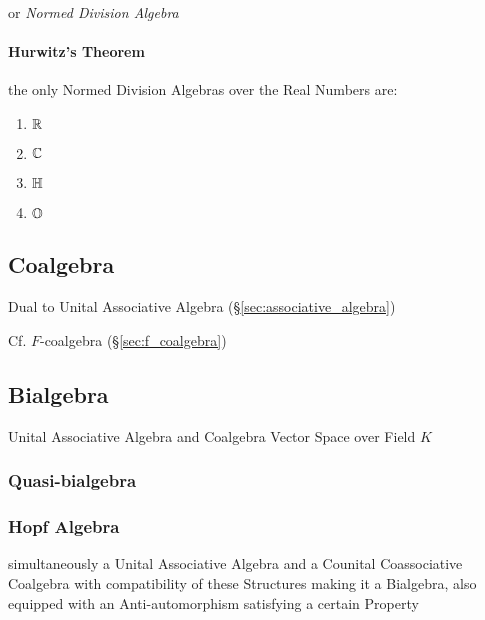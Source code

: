 {{or \emph{Normed Division Algebra}



\paragraph{Hurwitz's Theorem}\label{sec:hurwitzs_theorem}\hfill

the only Normed Division Algebras over the Real Numbers are:
\begin{enumerate}
  \item $\mathbb{R}$
  \item $\mathbb{C}$
  \item $\mathbb{H}$
  \item $\mathbb{O}$
\end{enumerate}



\subsection{Coalgebra}\label{sec:coalgebra}

Dual to Unital Associative Algebra (\S\ref{sec:associative_algebra})

Cf. $F$-coalgebra (\S\ref{sec:f_coalgebra})



\subsection{Bialgebra}\label{sec:bialgebra}

Unital Associative Algebra and Coalgebra Vector Space over Field $K$



\subsubsection{Quasi-bialgebra}\label{sec:quasi_bialgebra}

\subsubsection{Hopf Algebra}\label{sec:hopf_algebra}

simultaneously a Unital Associative Algebra and a Counital
Coassociative Coalgebra with compatibility of these Structures making
it a Bialgebra, also equipped with an Anti-automorphism satisfying a
certain Property %

}}
